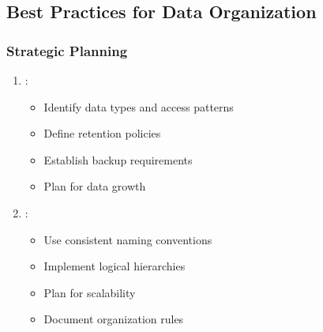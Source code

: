 \documentclass[letterpaper,10pt,english]{sphinxmanual}
\begin{document}
\subsection{Best Practices for Data Organization}
\label{\detokenize{data-organization:best-practices-for-data-organization}}

\subsubsection{Strategic Planning}
\label{\detokenize{data-organization:strategic-planning}}\begin{enumerate}
%
\item {} 
\sphinxAtStartPar
{}:
\begin{itemize}
\item {} 
\sphinxAtStartPar
Identify data types and access patterns

\item {} 
\sphinxAtStartPar
Define retention policies

\item {} 
\sphinxAtStartPar
Establish backup requirements

\item {} 
\sphinxAtStartPar
Plan for data growth

\end{itemize}

\item {} 
\sphinxAtStartPar
{}:
\begin{itemize}
\item {} 
\sphinxAtStartPar
Use consistent naming conventions

\item {} 
\sphinxAtStartPar
Implement logical hierarchies

\item {} 
\sphinxAtStartPar
Plan for scalability

\item {} 
\sphinxAtStartPar
Document organization rules

\end{itemize}

\end{enumerate}
\end{document}
